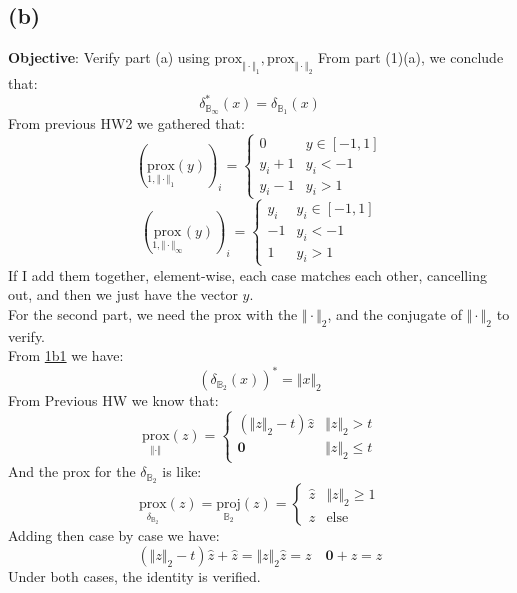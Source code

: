\documentclass[]{article}
\begin{document}
    \subsection*{(b)}
        \textbf{Objective}: Verify part (a) using $\text{prox}_{\Vert \cdot\Vert_1},\text{prox}_{\Vert \cdot\Vert_2}$
        From part (1)(a), we conclude that: 
        $$
        \delta_{\mathbb{B}_\infty}^*(x) = \delta_{\mathbb{B}_1}(x)
        $$
        From previous HW2 we gathered that: 
        $$
        \left(
            \underset{1, \Vert \cdot\Vert_1}{\text{prox}}(y)
        \right)_i
        =
        \begin{cases}
            0 & y \in [-1, 1]
            \\
            y_i + 1 & y_i < -1
            \\
            y_i - 1 & y_i > 1
        \end{cases}
        $$
        $$
        \left(
            \underset{1, \Vert \cdot\Vert_\infty}{\text{prox}}(y)
        \right)_i
        = 
        \begin{cases}
            y_i & y_i \in [-1, 1] \\
            -1 & y_i < -1 \\
            1 & y_i > 1
        \end{cases}
        $$
        If I add them together, element-wise, each case matches each other, cancelling out, and then we just have the vector $y$. 
        \\
        For the second part, we need the prox with the $\Vert \cdot\Vert_2$, and the conjugate of $\Vert \cdot\Vert_2$ to verify. 
        \\
        From \hyperref[eqn:1b1]{1b1} we have: 
        $$
            (\delta_{\mathbb{B}_2}(x))^* = \Vert x\Vert_2
        $$
        From Previous HW we know that: 
        $$
        \underset{\Vert \cdot\Vert}{\text{prox}}(z) 
        =
        \begin{cases}
            (\Vert z\Vert_2 - t)\widehat{z} & \Vert z\Vert_2 > t 
            \\
            \mathbf{0} & \Vert z\Vert_2 \le t
        \end{cases}
        $$
        And the prox for the $\delta_{\mathbb{B}_2}$ is like: 
        $$
        \underset{\delta_{\mathbb{B}_2}}{\text{prox}}(z) = \underset{\mathbb{B}_2}{\text{proj}} (z)
        = \begin{cases}
            \widehat{z} & \Vert z\Vert_2 \ge 1
            \\
            z & \text{else}
        \end{cases}
        $$
        Adding then case by case we have: 
        $$
        (\Vert z\Vert_2 - t)\widehat{z} + \widehat{z} = \Vert z\Vert_2 \widehat{z} = z \quad \mathbf{0} + z = z
        $$
        Under both cases, the identity is verified. 
\end{document}
